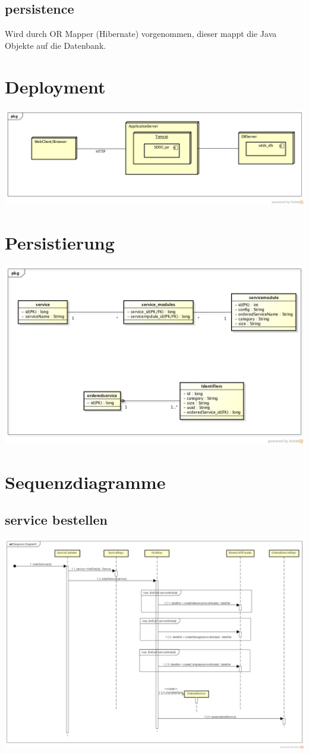 \documentclass[11pt]{scrartcl}
\begin{document}
\subsection{persistence}

Wird durch OR Mapper (Hibernate) vorgenommen, dieser mappt die Java Objekte auf 
die Datenbank.

\section{Deployment}

\includegraphics[width=\textwidth]{deployment}

\section{Persistierung}

\includegraphics[width=\textwidth]{Datenmodell}

\section{Sequenzdiagramme}
\subsection{service bestellen}

\begin{center}
\includegraphics[scale=0.3]{orderService}
\end{center}
\end{document}
